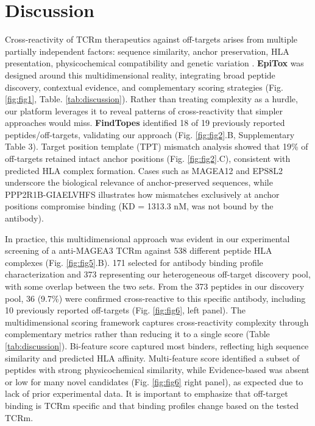 \documentclass[times, twoside, watermark]{zHenriquesLab-StyleBioRxiv}
\begin{document}
\section*{Discussion}   
    Cross-reactivity of TCRm therapeutics against off-targets arises from multiple partially independent factors: sequence similarity, anchor preservation, HLA presentation, physicochemical compatibility and genetic variation \cite{marrer2024physiological}. \textbf{EpiTox} was designed around this multidimensional reality, integrating broad peptide discovery, contextual evidence, and complementary scoring strategies (Fig. \ref{fig:fig1}, Table. \ref{tab:discussion}). Rather than treating complexity as a hurdle, our platform leverages it to reveal patterns of cross-reactivity that simpler approaches would miss.
    \textbf{FindTopes} identified 18 of 19 previously reported peptides/off-targets, validating our approach (Fig. \ref{fig:fig2}.B, Supplementary Table 3). Target position template (TPT) mismatch analysis showed that 19\% of off-targets retained intact anchor positions (Fig. \ref{fig:fig2}.C), consistent with predicted HLA complex formation. Cases such as MAGEA12 and EPS8L2 underscore the biological relevance of anchor-preserved sequences, while PPP2R1B-GIAELVHFS illustrates how mismatches exclusively at anchor positions compromise binding (KD = 1313.3 nM, was not bound by the antibody).
    
    In practice, this multidimensional approach was evident in our experimental screening of a anti-MAGEA3 TCRm against 538 different peptide HLA complexes (Fig. \ref{fig:fig5}.B). 171 selected for antibody binding profile characterization and 373 representing our heterogeneous off-target discovery pool, with some overlap between the two sets. From the 373 peptides in our discovery pool, 36 (9.7\%) were confirmed cross-reactive to this specific antibody, including 10 previously reported off-targets (Fig. \ref{fig:fig6}, left panel). The multidimensional scoring framework captures cross-reactivity complexity through complementary metrics rather than reducing it to a single score (Table \ref{tab:discussion}). Bi-feature score captured most binders, reflecting high sequence similarity and predicted HLA affinity. Multi-feature score identified a subset of peptides with strong physicochemical similarity, while Evidence-based was absent or low for many novel candidates (Fig. \ref{fig:fig6} right panel), as expected due to lack of prior experimental data. It is important to emphasize that off-target binding is TCRm specific and that binding profiles change based on the tested TCRm.
    
\end{document}
